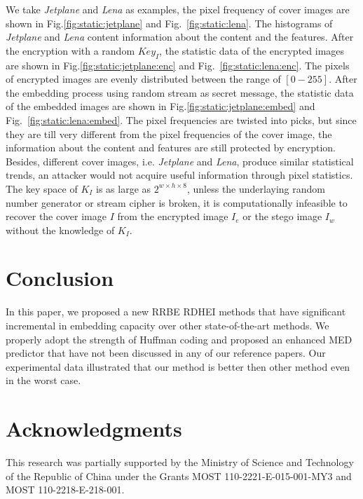 \documentclass[journal]{IEEEtran}
\begin{document}
	We take \emph{Jetplane} and \emph{Lena} as examples, the pixel frequency of cover images are shown in Fig.\ref{fig:static:jetplane} and Fig.~\ref{fig:static:lena}.
	The histograms of \emph{Jetplane} and \emph{Lena} content information about the content and the features.
	After the encryption with a random \(Key_I\), the statistic data of the encrypted images are shown in Fig.\ref{fig:static:jetplane:enc} and Fig.~\ref{fig:static:lena:enc}.
	The pixels of encrypted images are evenly distributed between the range of \([0-255]\).
	After the embedding process using random stream as secret message, the statistic data of the embedded images are shown in Fig.\ref{fig:static:jetplane:embed} and Fig.~\ref{fig:static:lena:embed}.
	The pixel frequencies are twisted into picks, but since they are till very different from the pixel frequencies of the cover image, the information about the content and features are still protected by encryption. 
	Besides, different cover images, i.e. \emph{Jetplane} and \emph{Lena}, produce similar statistical trends, an attacker would not acquire useful information through pixel statistics.
	The key space of \(K_I\) is as large as \(2^{w \times h \times 8}\), unless the underlaying random number generator or stream cipher is broken, it is computationally infeasible to recover the cover image \(I\) from the encrypted image \(I_e\) or the stego image \(I_w\) without the knowledge of \(K_I\).
	

	\section{Conclusion}
	\label{sec:conclusion}
	
	In this paper, we proposed a new RRBE RDHEI methods that have significant incremental in embedding capacity over other state-of-the-art methods.
	We properly adopt the strength of Huffman coding and proposed an enhanced MED predictor that have not been discussed in any of our reference papers.
%	
	Our experimental data illustrated that our method is better then other method even in the worst case. 
	
	\section*{Acknowledgments}
	\noindent
	This research was partially supported by the Ministry of Science and Technology of the Republic of China under the Grants MOST 110-2221-E-015-001-MY3 and MOST 110-2218-E-218-001.
	
\end{document}
